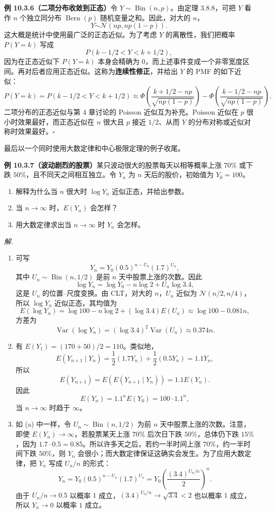 \documentclass[UTF8,12pt,a4paper,fontset=fandol]{ctexart}
\begin{document}
\noindent\textbf{例 10.3.6（二项分布收敛到正态）}\quad 令 $Y\sim\operatorname{Bin}(n,p)$。由定理 3.8.8，可把 $Y$ 看作 $n$ 个独立同分布 $\operatorname{Bern}(p)$ 随机变量之和。因此，对大的 $n$，
\[
  Y\dot\sim\mathcal N(np,np(1-p)).
\]
这大概是统计中使用最广泛的正态近似。为了考虑 $Y$ 的离散性，我们把概率 $P(Y=k)$ 写成
\[
  P(k-1/2<Y<k+1/2),
\]
因为在正态近似下 $P(Y=k)$ 本身会精确为 $0$，而上述事件变成一个非零宽度区间。再对后者应用正态近似。这称为\textbf{连续性修正}，并给出 $Y$ 的 PMF 的如下近似：
\[
  P(Y=k)=P(k-1/2<Y<k+1/2)
  \approx
  \Phi\left(\frac{k+1/2-np}{\sqrt{np(1-p)}}\right)
  -\Phi\left(\frac{k-1/2-np}{\sqrt{np(1-p)}}\right).
\]
二项分布的正态近似与第 4 章讨论的 Poisson 近似互为补充。Poisson 近似在 $p$ 很小时效果最好，而正态近似在 $n$ 很大且 $p$ 接近 $1/2$、从而 $Y$ 的分布对称或近似对称时效果最好。$\square$

最后以一个同时使用大数定律和中心极限定理的例子收尾。

\noindent\textbf{例 10.3.7（波动剧烈的股票）}\quad 某只波动很大的股票每天以相等概率上涨 $70\%$ 或下跌 $50\%$，且不同天之间相互独立。令 $Y_n$ 为 $n$ 天后的股价，初始值为 $Y_0=100$。

\begin{enumerate}
  \item 解释为什么当 $n$ 很大时 $\log Y_n$ 近似正态，并给出参数。
  \item 当 $n\to\infty$ 时，$E(Y_n)$ 会怎样？
  \item 用大数定律求出当 $n\to\infty$ 时 $Y_n$ 会怎样。
\end{enumerate}

\noindent\textit{解.}\quad
\begin{enumerate}
  \item 可写
  \[
    Y_n=Y_0(0.5)^{n-U_n}(1.7)^{U_n},
  \]
  其中 $U_n\sim\operatorname{Bin}(n,1/2)$ 是前 $n$ 天中股票上涨的次数。因此
  \[
    \log Y_n=\log Y_0-n\log 2+U_n\log 3.4,
  \]
  这是 $U_n$ 的位置--尺度变换。由 CLT，对大的 $n$，$U_n$ 近似为 $\mathcal N(n/2,n/4)$，所以 $\log Y_n$ 近似正态，其均值为
  \[
    E(\log Y_n)=\log 100-n\log 2+(\log 3.4)E(U_n)
    \approx \log 100-0.081n,
  \]
  方差为
  \[
    \operatorname{Var}(\log Y_n)=(\log 3.4)^2\operatorname{Var}(U_n)
    \approx 0.374n.
  \]

  \item 有 $E(Y_1)=(170+50)/2=110$。类似地，
  \[
    E(Y_{n+1}\mid Y_n)=\frac12(1.7Y_n)+\frac12(0.5Y_n)=1.1Y_n,
  \]
  所以
  \[
    E(Y_{n+1})=E(E(Y_{n+1}\mid Y_n))=1.1E(Y_n).
  \]
  因此
  \[
    E(Y_n)=1.1^nE(Y_0)=100\cdot 1.1^n,
  \]
  当 $n\to\infty$ 时趋于 $\infty$。

  \item 如 (a) 中一样，令 $U_n\sim\operatorname{Bin}(n,1/2)$ 为前 $n$ 天中股票上涨的次数。注意，即使 $E(Y_n)\to\infty$，若股票某天上涨 $70\%$ 后次日下跌 $50\%$，总体仍下跌 $15\%$，因为 $1.7\cdot 0.5=0.85$。所以许多天之后，若约一半时间上涨 $70\%$，约一半时间下跌 $50\%$，则 $Y_n$ 会很小；而大数定律保证这确实会发生。为了应用大数定律，把 $Y_n$ 写成 $U_n/n$ 的形式：
  \[
    Y_n=Y_0(0.5)^{n-U_n}(1.7)^{U_n}
    =Y_0\left(\frac{(3.4)^{U_n/n}}{2}\right)^n.
  \]
  由于 $U_n/n\to 0.5$ 以概率 $1$ 成立，$(3.4)^{U_n/n}\to\sqrt{3.4}<2$ 也以概率 $1$ 成立，所以 $Y_n\to 0$ 以概率 $1$ 成立。
\end{enumerate}
\end{document}
